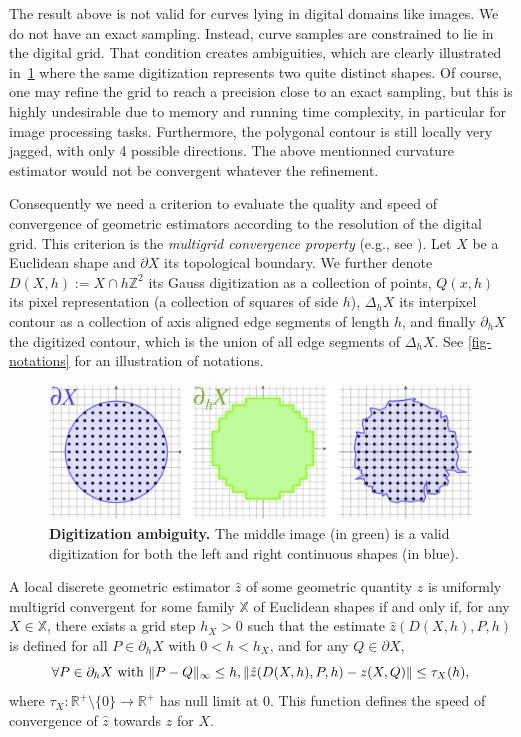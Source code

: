 \documentclass[review]{siamart220329}
\DeclarePairedDelimiter\norm{\lVert}{\rVert}%
\begin{document}
The result above is not valid for curves lying in digital domains like images.
We do not have an exact sampling. Instead, curve samples are constrained to lie
in the digital grid. That condition creates ambiguities, which are clearly
illustrated in~\cref{fig:digitization-ambiguity} where the same digitization
represents two quite distinct shapes. Of course, one may refine the grid to
reach a precision close to an exact sampling, but this is highly undesirable due
to memory and running time complexity, in particular for image processing tasks.
Furthermore, the polygonal contour is still locally very jagged, with only 4
possible directions. The above mentionned curvature estimator would not be
convergent whatever the refinement.

Consequently we need a criterion to evaluate the quality and speed of
convergence of geometric estimators according to the resolution of the digital
grid. This criterion is the \emph{multigrid convergence property} (e.g., see
\cite{klette2004digital}). Let $X$ be a Euclidean shape and $\partial X$ its
topological boundary. We further denote $D(X,h):=X \cap h\mathbb{Z}^2$ its Gauss
digitization as a collection  of points, $Q(x,h)$ its pixel representation (a
collection  of squares of side $h$), $\Delta_h X$ its interpixel contour as a
collection  of axis aligned edge segments of length $h$, and finally
$\partial_hX$ the digitized contour, which is the union of all edge segments of
$\Delta_h X$. See \cref{fig-notations} for an illustration of notations.
%
%
\begin{figure}
\center
\includegraphics[scale=1]{figures/ambiguity-and-boundaries.png}
\caption{
    \textbf{Digitization ambiguity.} The middle image (in green) is a valid
    digitization for both the left and right continuous shapes (in blue).}
\label{fig:digitization-ambiguity}
\end{figure}
%
%
\begin{definition}
A local discrete geometric estimator $\hat{z}$ of some geometric quantity $z$
is uniformly multigrid convergent for some family $\mathbb{X}$ of Euclidean
shapes if and only if, for any $X \in \mathbb{X}$, there exists a grid step
$h_X>0$ such that the estimate $\hat{z}(D(X,h), P,h)$ is defined for all $P
\in \partial_hX$ with $ 0 < h < h_X$, and for any $Q \in \partial X$,
%
%
\begin{equation*}
  \forall P \in  \partial_hX \text{ with } \norm{ P - Q }_{\infty} \leq h,
  \norm{ \hat{z}(D(X,h),P,h) - z(X,Q)} \leq \tau_{X}(h),			
\end{equation*}
%
%
where $\tau_{X}:\mathbb{R}^{+}\setminus\{0\} \rightarrow
\mathbb{R}^{+}$ has null limit at $0$. This function defines the
speed of convergence of $\hat{z}$ towards $z$ for $X$.
\end{definition}
	
\end{document}
